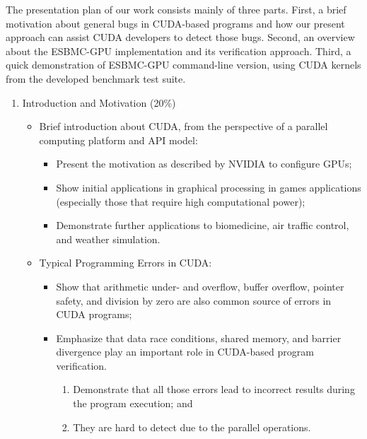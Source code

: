 \documentclass{llncs}
\begin{document}
\noindent The presentation plan of our work consists mainly of three parts. First, a brief motivation about general bugs in CUDA-based programs and how our present approach can assist CUDA developers to detect those bugs. Second, an overview about the ESBMC-GPU implementation and its verification approach. Third, a quick demonstration of ESBMC-GPU command-line version, using CUDA kernels from the developed benchmark test suite.
\\
\begin{enumerate}
  \item Introduction and Motivation (20\%)
  \\
  \begin{itemize} 
     \item Brief introduction about CUDA, from the perspective of a parallel computing platform and API model:
        \begin{itemize}
		\item Present the motivation as described by NVIDIA to configure GPUs;
		\item Show initial applications in graphical processing in games applications (especially those that require high computational power);
		\item Demonstrate further applications to biomedicine, air traffic control, and weather simulation. \\
	\end{itemize}
	
     \item Typical Programming Errors in CUDA:
         \begin{itemize}
		\item Show that arithmetic under- and overflow, buffer overflow, pointer safety, and division by zero are also common source of errors in CUDA programs;
		\item Emphasize that data race conditions, shared memory, and barrier divergence play an important role in CUDA-based program verification.
			\begin{enumerate}
				\item Demonstrate that all those errors lead to incorrect results during the program execution; and
				\item They are hard to detect due to the parallel operations. \\
			\end{enumerate}
	\end{itemize}
	

\end{itemize}
\end{enumerate}
\end{document}
